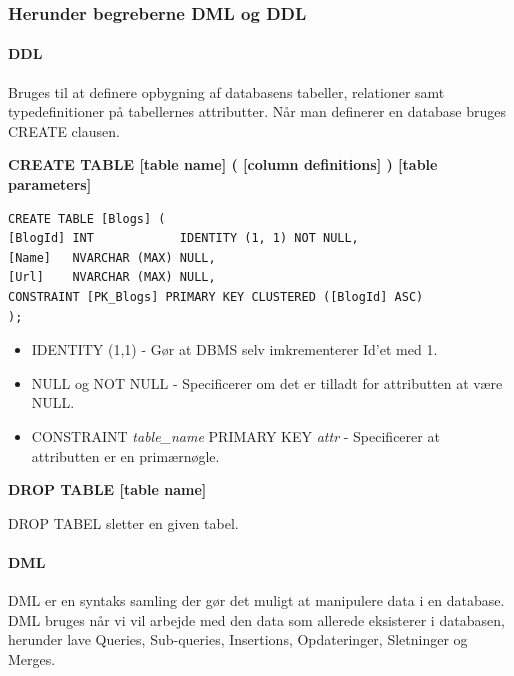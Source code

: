 \subsubsection{Herunder begreberne DML og DDL}

\paragraph{DDL}
Bruges til at definere opbygning af databasens tabeller, relationer samt typedefinitioner på tabellernes attributter. Når man definerer en database bruges CREATE clausen.

\textbf{CREATE TABLE [table name] ( [column definitions] ) [table parameters]}

\begin{lstlisting}[caption=eksempel på CREATE]
CREATE TABLE [Blogs] (
[BlogId] INT            IDENTITY (1, 1) NOT NULL,
[Name]   NVARCHAR (MAX) NULL,
[Url]    NVARCHAR (MAX) NULL,
CONSTRAINT [PK_Blogs] PRIMARY KEY CLUSTERED ([BlogId] ASC)
);
\end{lstlisting}

\begin{itemize}
	\item IDENTITY (1,1) - Gør at DBMS selv imkrementerer Id'et med 1.
	\item NULL og NOT NULL - Specificerer om det er tilladt for attributten at være NULL.
	\item CONSTRAINT \textit{table\_name} PRIMARY KEY \textit{attr} - Specificerer at attributten er en primærnøgle.
\end{itemize}

\textbf{DROP TABLE [table name]}

DROP TABEL sletter en given tabel.

\paragraph{DML}
DML er en syntaks samling der gør det muligt at manipulere data i en database.
DML bruges når vi vil arbejde med den data som allerede eksisterer i databasen, herunder lave Queries, Sub-queries, Insertions, Opdateringer, Sletninger og Merges.

